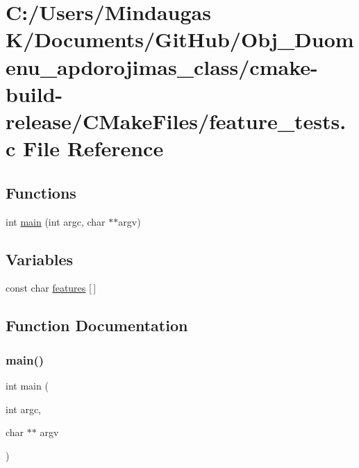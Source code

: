 \hypertarget{cmake-build-release_2_c_make_files_2feature__tests_8c}{}\section{C\+:/\+Users/\+Mindaugas K/\+Documents/\+Git\+Hub/\+Obj\+\_\+\+Duomenu\+\_\+apdorojimas\+\_\+class/cmake-\/build-\/release/\+C\+Make\+Files/feature\+\_\+tests.c File Reference}
\label{cmake-build-release_2_c_make_files_2feature__tests_8c}
\subsection*{Functions}
\begin{DoxyCompactItemize}
\item 
int \mbox{\hyperlink{cmake-build-release_2_c_make_files_2feature__tests_8c_a3c04138a5bfe5d72780bb7e82a18e627}{main}} (int argc, char $\ast$$\ast$argv)
\end{DoxyCompactItemize}
\subsection*{Variables}
\begin{DoxyCompactItemize}
\item 
const char \mbox{\hyperlink{cmake-build-release_2_c_make_files_2feature__tests_8c_a1582568e32f689337602a16bf8a5bff0}{features}} \mbox{[}$\,$\mbox{]}
\end{DoxyCompactItemize}


\subsection{Function Documentation}
\mbox{\label{cmake-build-release_2_c_make_files_2feature__tests_8c_a3c04138a5bfe5d72780bb7e82a18e627}} 
\subsubsection{\texorpdfstring{main()}{main()}}
{\footnotesize\ttfamily int main (\begin{DoxyParamCaption}\item[{int}]{argc,  }\item[{char $\ast$$\ast$}]{argv }\end{DoxyParamCaption})}



